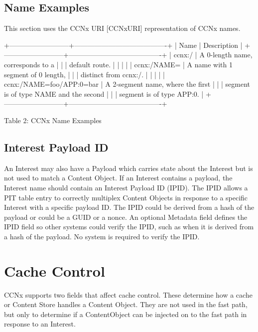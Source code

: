 \documentclass[12pt]{report}
\begin{document}
\subsection{Name Examples}
This section uses the CCNx URI [CCNxURI] representation of CCNx names.

+--------------------------+----------------------------------------+
|           Name           | Description                            |
+--------------------------+----------------------------------------+
|          ccnx:/          | A 0-length name, corresponds to a      |
|                          | default route.                         |
|                          |                                        |
|       ccnx:/NAME=        | A name with 1 segment of 0 length,     |
|                          | distinct from ccnx:/.                  |
|                          |                                        |
| ccnx:/NAME=foo/APP:0=bar | A 2-segment name, where the first      |
|                          | segment is of type NAME and the second |
|                          | segment is of type APP:0.              |
+--------------------------+----------------------------------------+

                     Table 2: CCNx Name Examples

\subsection{Interest Payload ID}
An Interest may also have a Payload which carries state about the
Interest but is not used to match a Content Object.  If an Interest
contains a payload, the Interest name should contain an Interest
Payload ID (IPID).  The IPID allows a PIT table entry to correctly
multiplex Content Objects in response to a specific Interest with a
specific payload ID.  The IPID could be derived from a hash of the
payload or could be a GUID or a nonce.  An optional Metadata field
defines the IPID field so other systems could verify the IPID, such
as when it is derived from a hash of the payload.  No system is
required to verify the IPID.

\section{Cache Control}
CCNx supports two fields that affect cache control.  These determine
how a cache or Content Store handles a Content Object.  They are not
used in the fast path, but only to determine if a ContentObject can
be injected on to the fast path in response to an Interest.
\end{document}
